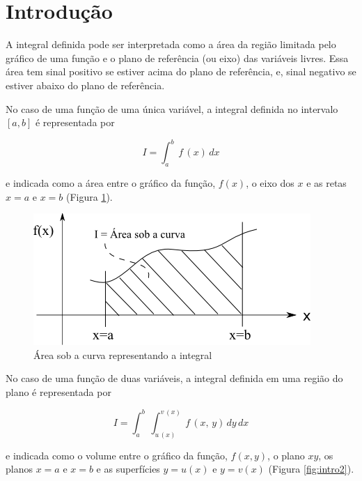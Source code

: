 \section{Introdução}

A integral definida pode ser interpretada como a \'area da regi\~ao limitada pelo gr\'afico de uma fun\c{c}\~ao e o plano de refer\^encia (ou eixo) das vari\'aveis livres. 
Essa \'area tem sinal positivo se estiver acima do plano de refer\^encia, e, sinal negativo se estiver abaixo do plano de refer\^encia.

No caso de uma fun\c{c}\~ao de uma \'unica vari\'{a}vel, a integral definida no intervalo $[a, b]$ \'e representada por 

\begin{equation}
 I = \int_a^b \, f\,(x) \, dx
\end{equation}

\noindent
e indicada como a \'area entre o gr\'afico da fun\c{c}\~ao, $f(x)$, o eixo dos $x$ e as retas $x = a$ e $x = b$ (Figura \ref{fig:intro1}).

\begin{figure}[htb]
 \centering
    \includegraphics[scale=0.8]{capitulos/capitulo2/figuras/intro1.png}
    \caption{\'Area sob a curva representando a integral}
    \label{fig:intro1}
\end{figure}

No caso de uma fun\c{c}\~ao de duas vari\'{a}veis, a integral definida em uma regi\~{a}o do plano \'e representada por

\begin{equation}
   I = \displaystyle \int_a^b \, \int_{u\,(x)}^{v\,(x)} \, f\,(x,\,y) \, dy \, dx
\end{equation}

\noindent
e indicada como o volume entre o gr\'afico da fun\c{c}\~ao, $f(x,y)$, o plano $xy$, os planos $x = a$ e $x = b$ e as superf\'icies $y = u(x)$ e $y = v(x)$ (Figura \ref{fig:intro2}).

